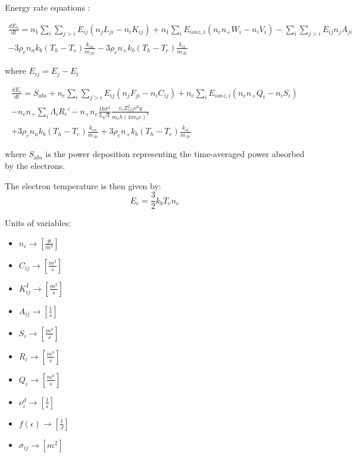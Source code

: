 Energy rate equations \citep{kapper2011ionizing}:

\begin{multline}
    \label{eq:energy_cons_atoms}
    \frac{d E_h}{dt}  =   n_1 \sum_i \sum_{j>i} E_{ij} (n_j L_{ji} - n_i K_{ij})  + n_1 \sum_i E_{ionz,i} (n_e n_+ W_i - n_i V_i) -  \sum_i \sum_{j>i} E_{ij} n_j A_{ji}\\
    - 3 \rho_e n_n k_b (T_h -T_e) \frac{k_{en}}{m_{Ar}} - 3 \rho_e n_+ k_b (T_h -T_e) \frac{\overline{k}_{ei}}{m_{Ar}}
\end{multline}

\noindent where $E_{ij} = E_j - E_i$ 


\begin{multline}
    \label{eq:energy_cons_electrons}
    \frac{d E_e}{dt}  =  S_{abs} +  n_e \sum_i \sum_{j>i} E_{ij} (n_j F_{ji} - n_i C_{ij})  + n_e \sum_i E_{ionz,i} (n_e n_+ Q_i - n_i S_i) \\ 
    -n_e n_+ \sum_i \Lambda_i R_i' 
    - n_+ n_e \frac{16 \pi^2}{3 \sqrt{3}} \frac{\overline{v_e} Z_{eff}^2 e^6 \overline{g}}{m_e h (4 \pi \epsilon_0 c)^3} \\
    + 3 \rho_e n_n k_b (T_h -T_e) \frac{k_{en}}{m_{Ar}} + 3 \rho_e n_+ k_b (T_h -T_e) \frac{\overline{k}_{ei}}{m_{Ar}}
\end{multline}

\noindent where $S_{abs}$ is the power deposition representing the time-averaged power absorbed by the electrons. 

The electron temperature is then given by: 
\begin{equation}
    E_e = \frac{3}{2} k_b  T_e n_e   
\end{equation}


Units of variables:

\begin{itemize}[noitemsep,topsep=1pt,parsep=1pt,partopsep=3pt]
    \item $n_i \rightarrow [\frac{\#}{m^3}]$
    \item $C_{ij} \rightarrow [\frac{m^3}{s}]$
    \item $K_{ij}^I \rightarrow [\frac{m^3}{s}]$
    \item $A_{ij} \rightarrow [\frac{1}{s}]$
    \item $S_i  \rightarrow [\frac{m^3}{s}]$
    \item $R_i  \rightarrow [\frac{m^3}{s}]$
    \item $Q_i  \rightarrow [\frac{m^6}{s}]$
    \item $\nu_i^d \rightarrow [\frac{1}{s}]$
    \item $f(\epsilon) \rightarrow [\frac{1}{J}]$
    \item $\sigma_{ij} \rightarrow [m^2]$    
\end{itemize}



